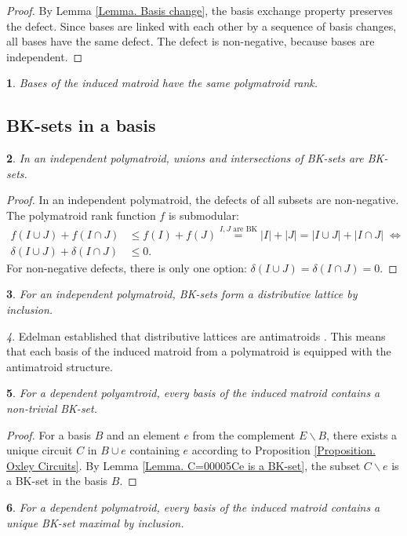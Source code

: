 \documentclass[11pt]{article}
\theoremstyle{plain}
\newtheorem{thm}{\protect\theoremname}[section]
\theoremstyle{definition}
\theoremstyle{remark}
\newtheorem{rem}[thm]{\protect\remarkname}
\theoremstyle{plain}
\newtheorem{lem}[thm]{\protect\lemmaname}
\theoremstyle{plain}
\theoremstyle{plain}
\newtheorem{cor}[thm]{\protect\corollaryname}
\theoremstyle{definition}
\providecommand{\corollaryname}{Corollary}
\providecommand{\lemmaname}{Lemma}
\providecommand{\remarkname}{Remark}
\providecommand{\theoremname}{Theorem}
\begin{document}
\begin{proof}
By Lemma \ref{Lemma. Basis change}, the basis exchange property preserves
the defect. Since bases are linked with each other by a sequence of
basis changes, all bases have the same defect. The defect is non-negative,
because bases are independent.
\end{proof}
\begin{cor}
Bases of the induced matroid have the same polymatroid rank.
\end{cor}


\subsection{BK-sets in a basis}
\begin{lem}
\label{Lemma. The union and intersection of BK-sets are BK-sets}In
an independent polymatroid, unions and intersections of BK-sets are
BK-sets.
\end{lem}

\begin{proof}
In an independent polymatroid, the defects of all subsets are non-negative.
The polymatroid rank function $f$ is submodular:
\begin{align*}
f(I\cup J)+f(I\cap J) & \leq f(I)+f(J)\overset{I,J\text{ are BK}}{=}|I|+|J|=|I\cup J|+|I\cap J|\;\Leftrightarrow\\
\delta(I\cup J)+\delta(I\cap J) & \leq0.
\end{align*}
For non-negative defects, there is only one option: $\delta(I\cup J)=\delta(I\cap J)=0.$
\end{proof}
\begin{cor}
\label{Corollary. Distributice lattice of BK-subsets}For an independent
polymatroid, BK-sets form a distributive lattice by inclusion.
\end{cor}

\begin{rem}
Edelman established that distributive lattices are antimatroids \cite{edelman_meet-distributive_1980}.
This means that each basis of the induced matroid from a polymatroid
is equipped with the antimatroid structure.
\end{rem}

\begin{lem}
\label{Lemma. Ecah basis contains a BK-set}For a dependent polyamtroid,
every basis of the induced matroid contains a non-trivial BK-set.
\end{lem}

\begin{proof}
For a basis $B$ and an element $e$ from the complement $E\backslash B$,
there exists a unique circuit $C$ in $B\cup e$ containing $e$ according
to Proposition \ref{Proposition. Oxley Circuits}. By Lemma \ref{Lemma. C=00005Ce is a BK-set},
the subset $C\backslash e$ is a BK-set in the basis $B$.
\end{proof}
\begin{thm}
\label{Theorem. Each basis contains a unique maxamal BK-subtuple}For
a dependent polymatroid, every basis of the induced matroid contains
a unique BK-set maximal by inclusion.
\end{thm}
\end{document}
